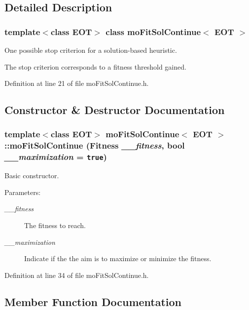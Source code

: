 \subsection{Detailed Description}
\subsubsection*{template$<$class EOT$>$ class moFitSolContinue$<$ EOT $>$}

One possible stop criterion for a solution-based heuristic. 

The stop criterion corresponds to a fitness threshold gained. 



Definition at line 21 of file moFitSolContinue.h.

\subsection{Constructor \& Destructor Documentation}
\subsubsection{\setlength{\rightskip}{0pt plus 5cm}template$<$class EOT$>$ {\bf moFitSolContinue}$<$ EOT $>$::{\bf moFitSolContinue} ({\bf Fitness} {\em \_\-\_\-fitness}, bool {\em \_\-\_\-maximization} = {\tt true})\hspace{0.3cm}{\tt  [inline]}}\label{classmo_fit_sol_continue_5af29ede3794a7a73d8f6b0d9ebccc80}


Basic constructor. 

\begin{Desc}
\item[Parameters:]
\begin{description}
\item[{\em \_\-\_\-fitness}]The fitness to reach. \item[{\em \_\-\_\-maximization}]Indicate if the the aim is to maximize or minimize the fitness. \end{description}
\end{Desc}


Definition at line 34 of file moFitSolContinue.h.

\subsection{Member Function Documentation}
